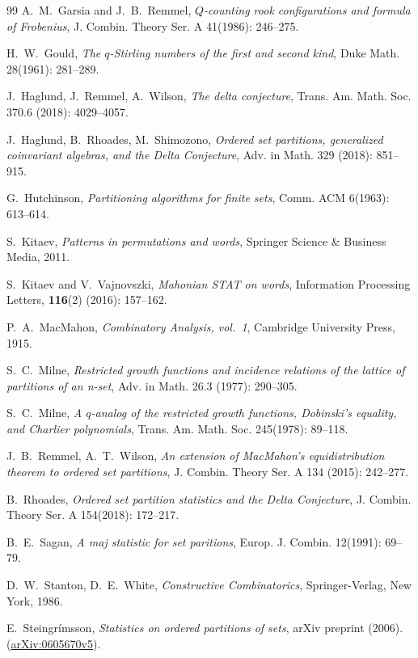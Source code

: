 \documentclass[12pt]{amsart}
\numberwithin{equation}{section}
\theoremstyle{plain}
\theoremstyle{definition}
\begin{document}
\begin{thebibliography}{99}
A.~M.~Garsia and J.~B.~Remmel, \emph{$Q$-counting rook configurations and formula of Frobenius}, J. Combin. Theory Ser. A 41(1986): 246--275.

H.~W.~Gould, \emph{The $q$-Stirling numbers of the first and second kind}, Duke Math. 28(1961): 281--289.

J.~Haglund, J.~Remmel, A.~Wilson, \emph{The delta conjecture}, Trans. Am. Math. Soc. 370.6 (2018): 4029--4057.

J.~Haglund, B.~Rhoades, M.~Shimozono, \emph{Ordered set partitions, generalized coinvariant algebras, and the Delta Conjecture}, Adv. in Math. 329 (2018): 851--915.

G.~Hutchinson, \emph{Partitioning algorithms for finite sets}, Comm. ACM 6(1963): 613--614.

S.~Kitaev, \emph{Patterns in permutations and words}, Springer Science \& Business Media, 2011.

S.~Kitaev and V.~Vajnovszki, \emph{Mahonian STAT on words}, Information Processing Letters, {\bf 116}(2) (2016): 157--162.

P.~A.~MacMahon, \emph{Combinatory Analysis, vol.~1}, Cambridge University Press, 1915.

S.~C.~Milne, \emph{Restricted growth functions and incidence relations of the lattice of partitions of an n-set}, Adv. in Math. 26.3 (1977): 290--305.

S.~C.~Milne, \emph{A $q$-analog of the restricted growth functions, Dobinski's equality, and Charlier polynomials}, Trans. Am. Math. Soc. 245(1978): 89--118.

J.~B.~Remmel, A.~T.~Wilson, \emph{An extension of MacMahon's equidistribution theorem to ordered set partitions}, J. Combin. Theory Ser. A 134 (2015): 242--277.

B.~Rhoades, \emph{Ordered set partition statistics and the Delta Conjecture}, J. Combin. Theory Ser. A 154(2018): 172--217.

B.~E.~Sagan, \emph{A maj statistic for set paritions},
Europ. J. Combin. 12(1991): 69--79.


D.~W.~Stanton, D.~E.~White, \emph{Constructive Combinatorics}, Springer-Verlag, New York, 1986.

E.~Steingr\'imsson, \emph{Statistics on ordered partitions of sets}, arXiv preprint (2006). (\href{https://arxiv.org/pdf/math/0605670.pdf}{arXiv:0605670v5}).


\end{thebibliography}
\end{document}
